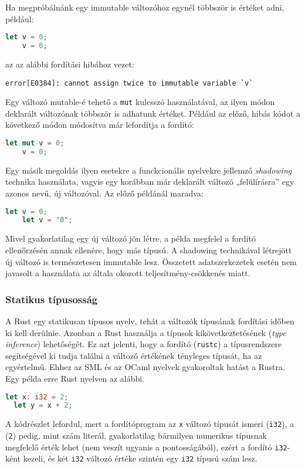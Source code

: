 Ha megpróbálnánk egy immutable változóhoz egynél többször is értéket adni, például:
\begin{lstlisting}[language=Rust, style=boxed]
    let v = 0;
    v = 0;
\end{lstlisting}
az az alábbi fordítási hibához vezet:
\begin{verbatim}
error[E0384]: cannot assign twice to immutable variable `v`
\end{verbatim}
Egy változó mutable-é tehető a \texttt{mut} kulcsszó használatával, az ilyen módon deklarált változónak többször is adhatunk értéket. Például az előző, hibás kódot a következő módon módosítva már lefordítja a fordító:
\begin{lstlisting}[language=Rust, style=boxed]
    let mut v = 0;
    v = 0;
\end{lstlisting}
Egy másik megoldás ilyen esetekre a funckcionális nyelvekre %
jellemző \textit{shadowing} technika használata, vagyis egy korábban már deklarált változó „felülírásra” egy azonos nevű, új változóval. Az előző példánál maradva:
\begin{lstlisting}[language=Rust, style=boxed]
    let v = 0;
    let v = "0";
\end{lstlisting}
Mivel gyakorlatilag egy új változó jön létre, a példa megfelel a fordító ellenőrzésén annak ellenére, hogy más típusú. A shadowing technikával létrejött új változó is természetesen immutable lesz. Összetett adatszerkezetek esetén nem javasolt a használata az általa okozott teljesítmény-csökkenés miatt.

\subsubsection{Statikus típusosság}
A Rust egy statikusan típusos nyelv, tehát a változók típusának fordítási időben ki kell derülnie. Azonban a Rust használja a típusok kikövetkeztetésének (\textit{type inference}) lehetőségét. Ez azt jelenti, hogy a fordító (\lstinline{rustc}) a típusrendszere segítségével ki tudja találni a változó értékének tényleges típusát, ha az egyértelmű. Ehhez az SML és az OCaml nyelvek gyakoroltak hatást a Rustra. Egy példa erre Rust nyelven az alábbi.
\begin{lstlisting}[language=Rust, style=boxed]
  let x: i32 = 2;
  let y = x + 2;
\end{lstlisting}
A kódrészlet lefordul, mert a fordítóprogram az \lstinline{x} változó típusát ismeri (\lstinline{i32}), a (\lstinline{2}) pedig, mint szám literál, gyakorlatilag bármilyen numerikus típusnak megfelelő érték lehet (nem veszít ugyanis a pontosságából), ezért a fordító \lstinline{i32}-ként kezeli, és két \lstinline{i32} változó értéke szintén egy \lstinline{i32} típusú szám lesz.

